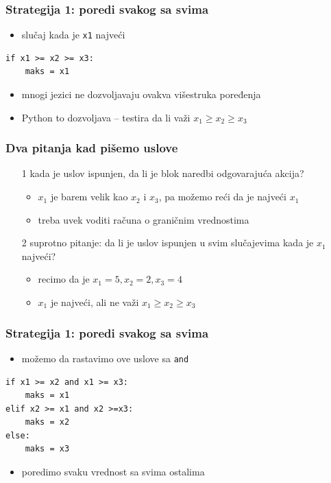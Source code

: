 \documentclass[utf8,compress,aspectratio=169]{beamer}
\begin{document}
\begin{frame}[fragile]
  \frametitle{Strategija 1: poredi svakog sa svima}
  \begin{itemize}
    \item slučaj kada je \texttt{x1} najveći
  \end{itemize}
\begin{verbatim}
if x1 >= x2 >= x3:
    maks = x1
\end{verbatim}
  \begin{itemize}
    \item mnogi jezici ne dozvoljavaju ovakva višestruka poređenja
    \item Python to dozvoljava -- testira da li važi $x_1 \geq x_2 \geq x_3$
  \end{itemize}
\end{frame}

\begin{frame}[fragile]
  \frametitle{Dva pitanja kad pišemo uslove}
  \begin{itemize}
    \item[1] kada je uslov ispunjen, da li je blok naredbi odgovarajuća akcija?
    \begin{itemize}
      \item $x_1$ je barem velik kao $x_2$ i $x_3$, pa možemo reći da je najveći $x_1$
      \item treba uvek voditi računa o graničnim vrednostima
    \end{itemize}
    \item[2] suprotno pitanje: da li je uslov ispunjen u svim slučajevima kada je $x_1$ najveći?
    \begin{itemize}
      \item recimo da je $x_1=5, x_2=2, x_3=4$
      \item $x_1$ je najveći, ali ne važi $x_1 \geq x_2 \geq x_3$
    \end{itemize}
  \end{itemize}
\end{frame}

\begin{frame}[fragile]
  \frametitle{Strategija 1: poredi svakog sa svima}
  \begin{itemize}
    \item možemo da rastavimo ove uslove sa \texttt{and}
  \end{itemize}
\begin{verbatim}
if x1 >= x2 and x1 >= x3:
    maks = x1
elif x2 >= x1 and x2 >=x3:
    maks = x2
else:
    maks = x3
\end{verbatim}
  \begin{itemize}
    \item poredimo svaku vrednost sa svima ostalima
  \end{itemize}
\end{frame}
\end{document}
